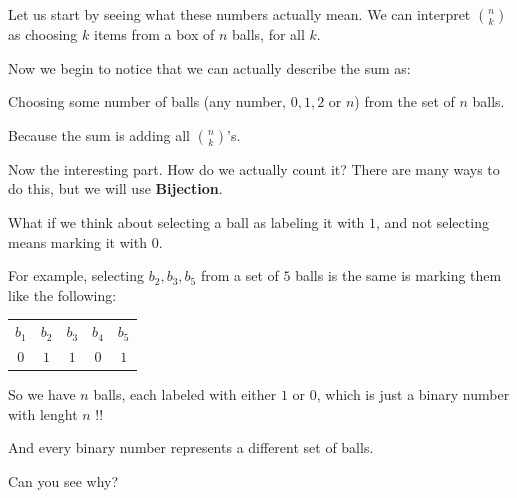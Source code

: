 \documentclass[compress]{beamer}
\begin{document}
\begin{frame}
    Let us start by seeing what these numbers actually mean.
    \textcolor{NordBrightBlue}{We can interpret ${n\choose k}$ as choosing $k$
    items from a box of $n$ balls, for all $k$.} 

    \pause\vspace{1em}

    Now we begin to notice that we can actually describe the sum as:

    \vspace{1em}
    \begin{center}
        \begin{minipage}{.85\linewidth}
            \textcolor{NordRed}{Choosing some number of balls (any number, $0, 1, 2$ or
            $n$) from the set of $n$ balls.}
        \end{minipage}
    \end{center}
    
    \vspace{.5em} Because the sum is adding all ${n \choose k}$'s.

    \pause \vspace{1em}

    Now the interesting part. How do we actually count it? There are many ways
    to do this, but we will use \textbf{Bijection}.
\end{frame}

\begin{frame}
    \textcolor{NordBrightBlue}{What if we think about selecting a ball as
    labeling it with $1$, and not selecting means marking it with $0$.} 

    \vspace{1em}

    For example, selecting $b_2, b_3, b_5$ from a set of $5$ balls is the same
    is marking them like the following:
    
    \vspace{1em}

    \begin{center}
        \begin{tabular}{ccccc}
            $b_1$ & $b_2$ & $b_3$ & $b_4$ & $b_5$\\
            $0$ & $1$ & $1$ & $0$ & $1$
        \end{tabular}
    \end{center}
\end{frame}

\begin{frame}

    \textcolor{NordRed}{So we have $n$ balls, each labeled with either $1$ or
    $0$, which is just a binary number with lenght $n$   !!}
    
    \vspace{1em}
    And every binary number represents a different set of balls.

    \pause\vspace{1em}

    Can you see why?
\end{frame}
\end{document}
